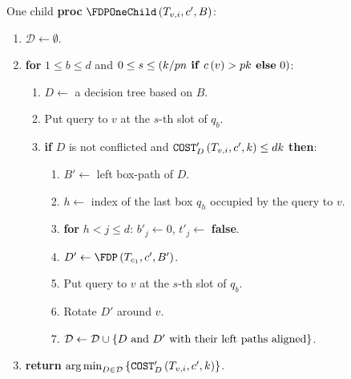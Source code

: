 \begin{frame}{One child}
    \textbf{proc} $\FDPOneChild\br{T_{v,i},c',B}$:
    \begin{enumerate}
        \item $\mathcal{D}\gets\emptyset$.
        \item \textbf{for} $1\leq b\leq d$ and $0\leq s\leq \left( k/pn \text{\textbf{ if} }c\left( v \right)>pk \text{\textbf{ else} 0} \right)$:
        \begin{enumerate}
            \item $D\gets $ a decision tree based on $B$.
            \item Put query to $v$ at the $s$-th slot of $q_b$.
            \item \textbf{if} $D$ is not conflicted and $\texttt{COST}'_{D}\left( T_{v,i},c',k \right)\leq dk$ \textbf{then}:
            \begin{enumerate}
                \item $B'\gets$ left box-path of $D$.

                \item $h\gets$ index of the last box $q_h$ occupied by the query to $v$.

                \item \textbf{for} $h < j\leq d$: $b'_{j}\gets 0$, $t'_{j}\gets $ \textbf{false}.
                \item $D'\gets \FDP\br{T_{c_1},c', B'}$.

                \item Put query to $v$ at the $s$-th slot of $q_b$.

                \item Rotate $D'$ around $v$.

                \item $\mathcal{D}\gets \mathcal{D} \cup \left\{ D \text{ and } D' \text{ with their left paths aligned} \right\}$.
            \end{enumerate}
        \end{enumerate}
        \item \textbf{return} $\operatorname*{arg\,min}_{D\in \mathcal{D}}\left\{ \texttt{COST}'_D\left( T_{v,i},c', k \right) \right\}$.
    \end{enumerate}
\end{frame}
